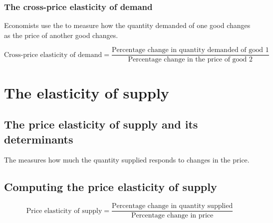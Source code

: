\subsubsection{The cross-price elasticity of demand}

Economists use the  to measure how the quantity demanded of one good changes as the price of another good changes.

\begin{equation}
  \text{Cross-price elasticity of demand} = \frac{\text{Percentage change in quantity demanded of good 1}}{\text{Percentage change in the price of good 2}}
\end{equation}


\section{The elasticity of supply}

\subsection{The price elasticity of supply and its determinants}

The  measures how much the quantity supplied responds to changes in the price.

\subsection{Computing the price elasticity of supply}

\begin{equation}
  \text{Price elasticity of supply} = \frac{\text{Percentage change in quantity supplied}}{\text{Percentage change in price}}
\end{equation}


